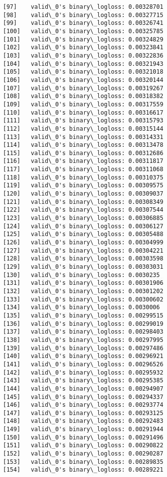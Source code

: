 \documentclass[11pt]{article}
\begin{document}
\begin{Verbatim}[commandchars=\\\{\}]
[97]	valid\_0's binary\_logloss: 0.00328701
[98]	valid\_0's binary\_logloss: 0.00327715
[99]	valid\_0's binary\_logloss: 0.00326741
[100]	valid\_0's binary\_logloss: 0.00325785
[101]	valid\_0's binary\_logloss: 0.00324829
[102]	valid\_0's binary\_logloss: 0.00323841
[103]	valid\_0's binary\_logloss: 0.00322836
[104]	valid\_0's binary\_logloss: 0.00321943
[105]	valid\_0's binary\_logloss: 0.00321018
[106]	valid\_0's binary\_logloss: 0.00320144
[107]	valid\_0's binary\_logloss: 0.00319267
[108]	valid\_0's binary\_logloss: 0.00318382
[109]	valid\_0's binary\_logloss: 0.00317559
[110]	valid\_0's binary\_logloss: 0.00316617
[111]	valid\_0's binary\_logloss: 0.00315793
[112]	valid\_0's binary\_logloss: 0.00315144
[113]	valid\_0's binary\_logloss: 0.00314331
[114]	valid\_0's binary\_logloss: 0.00313478
[115]	valid\_0's binary\_logloss: 0.00312686
[116]	valid\_0's binary\_logloss: 0.00311817
[117]	valid\_0's binary\_logloss: 0.00311068
[118]	valid\_0's binary\_logloss: 0.00310375
[119]	valid\_0's binary\_logloss: 0.00309575
[120]	valid\_0's binary\_logloss: 0.00309037
[121]	valid\_0's binary\_logloss: 0.00308349
[122]	valid\_0's binary\_logloss: 0.00307544
[123]	valid\_0's binary\_logloss: 0.00306885
[124]	valid\_0's binary\_logloss: 0.00306127
[125]	valid\_0's binary\_logloss: 0.00305488
[126]	valid\_0's binary\_logloss: 0.00304999
[127]	valid\_0's binary\_logloss: 0.00304221
[128]	valid\_0's binary\_logloss: 0.00303598
[129]	valid\_0's binary\_logloss: 0.00303031
[130]	valid\_0's binary\_logloss: 0.0030235
[131]	valid\_0's binary\_logloss: 0.00301906
[132]	valid\_0's binary\_logloss: 0.00301202
[133]	valid\_0's binary\_logloss: 0.00300602
[134]	valid\_0's binary\_logloss: 0.0030006
[135]	valid\_0's binary\_logloss: 0.00299515
[136]	valid\_0's binary\_logloss: 0.00299019
[137]	valid\_0's binary\_logloss: 0.00298403
[138]	valid\_0's binary\_logloss: 0.00297995
[139]	valid\_0's binary\_logloss: 0.00297486
[140]	valid\_0's binary\_logloss: 0.00296921
[141]	valid\_0's binary\_logloss: 0.00296526
[142]	valid\_0's binary\_logloss: 0.00295932
[143]	valid\_0's binary\_logloss: 0.00295385
[144]	valid\_0's binary\_logloss: 0.00294907
[145]	valid\_0's binary\_logloss: 0.00294337
[146]	valid\_0's binary\_logloss: 0.00293774
[147]	valid\_0's binary\_logloss: 0.00293125
[148]	valid\_0's binary\_logloss: 0.00292483
[149]	valid\_0's binary\_logloss: 0.00291944
[150]	valid\_0's binary\_logloss: 0.00291496
[151]	valid\_0's binary\_logloss: 0.00290822
[152]	valid\_0's binary\_logloss: 0.00290287
[153]	valid\_0's binary\_logloss: 0.00289835
[154]	valid\_0's binary\_logloss: 0.00289221

\end{Verbatim}
\end{document}
